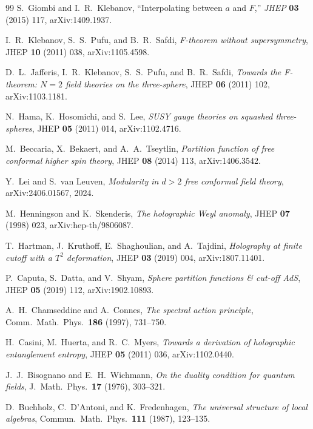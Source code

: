 \documentclass[11pt,a4paper]{article}
\theoremstyle{plain}
\theoremstyle{definition}
\begin{document}
\begin{thebibliography}{99}
S.~Giombi and I.~R.~Klebanov, ``Interpolating between $a$ and $F$,''
\emph{JHEP} \textbf{03} (2015) 117, arXiv:1409.1937.

 I.~R.~Klebanov, S.~S.~Pufu, and B.~R.~Safdi,
\emph{F-theorem without supersymmetry},
JHEP \textbf{10} (2011) 038, arXiv:1105.4598.

 D.~L.~Jafferis, I.~R.~Klebanov, S.~S.~Pufu, and B.~R.~Safdi,
\emph{Towards the F-theorem: $N = 2$ field theories on the three-sphere},
JHEP \textbf{06} (2011) 102, arXiv:1103.1181.

 N.~Hama, K.~Hosomichi, and S.~Lee,
\emph{SUSY gauge theories on squashed three-spheres},
JHEP \textbf{05} (2011) 014, arXiv:1102.4716.

 M.~Beccaria, X.~Bekaert, and A.~A.~Tseytlin,
\emph{Partition function of free conformal higher spin theory},
JHEP \textbf{08} (2014) 113, arXiv:1406.3542.

 Y.~Lei and S.~van Leuven,
\emph{Modularity in $d > 2$ free conformal field theory},
arXiv:2406.01567, 2024.

 M.~Henningson and K.~Skenderis,
\emph{The holographic Weyl anomaly},
JHEP \textbf{07} (1998) 023, arXiv:hep-th/9806087.

 T.~Hartman, J.~Kruthoff,
E.~Shaghoulian, and A.~Tajdini, \emph{Holography at finite cutoff with a
$T^{2}$ deformation}, JHEP \textbf{03} (2019) 004, arXiv:1807.11401.

 P.~Caputa, S.~Datta, and V.~Shyam,
\emph{Sphere partition functions \& cut-off AdS}, JHEP \textbf{05}
(2019) 112, arXiv:1902.10893.

 A.~H.~Chamseddine and A.~Connes,
\emph{The spectral action principle},
Comm.~Math.~Phys.\ \textbf{186} (1997), 731--750.

 H.~Casini, M.~Huerta, and R.~C.~Myers,
\emph{Towards a derivation of holographic entanglement entropy},
JHEP \textbf{05} (2011) 036, arXiv:1102.0440.

 J.~J.~Bisognano and E.~H.~Wichmann,
\emph{On the duality condition for quantum fields},
J.~Math.~Phys.\ \textbf{17} (1976), 303--321.

 D.~Buchholz, C.~D'Antoni, and
K.~Fredenhagen, \emph{The universal structure of local algebras},
Commun.\ Math.\ Phys.\ \textbf{111} (1987), 123--135.


\end{thebibliography}
\end{document}
